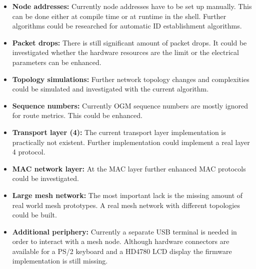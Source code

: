 \begin{itemize}
    \item \textbf{Node addresses:} Currently node addresses have to be set up manually. This can be done either at compile time or at runtime in the shell. Further algorithms could be researched for automatic ID establishment algorithms.
    \item \textbf{Packet drops:} There is still significant amount of packet drops. It could be investigated whether the hardware resources are the limit or the electrical parameters can be enhanced.
    \item \textbf{Topology simulations:} Further network topology changes and complexities could be simulated and investigated with the current algorithm.
    \item \textbf{Sequence numbers:} Currently OGM sequence numbers are mostly ignored for route metrics. This could be enhanced.
    \item \textbf{Transport layer (4):} The current transport layer implementation is practically not existent. Further implementation could implement a real layer 4 protocol.
    \item \textbf{MAC network layer:} At the MAC layer further enhanced MAC protocols could be investigated.
    \item \textbf{Large mesh network:} The most important lack is the missing amount of real world mesh prototypes. A real mesh network with different topologies could be built.
    \item \textbf{Additional periphery:} Currently a separate USB terminal is needed in order to interact with a mesh node. Although hardware connectors are available for a PS/2 keyboard and a HD4780 LCD display the firmware implementation is still missing.
\end{itemize}
